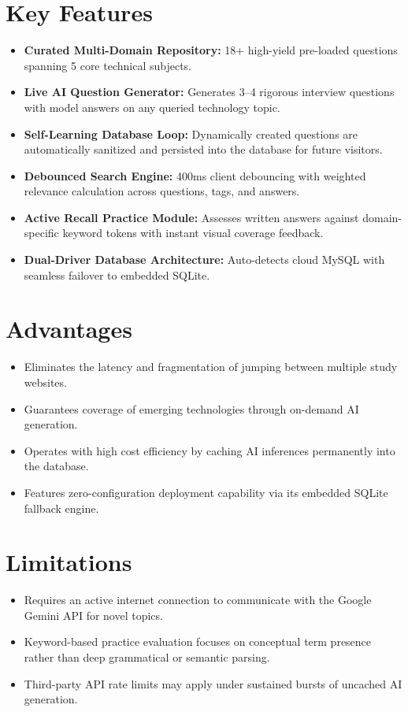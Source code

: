 \section{Key Features}
\begin{itemize}
    \item \textbf{Curated Multi-Domain Repository:} 18+ high-yield pre-loaded questions spanning 5 core technical subjects.
    \item \textbf{Live AI Question Generator:} Generates 3--4 rigorous interview questions with model answers on any queried technology topic.
    \item \textbf{Self-Learning Database Loop:} Dynamically created questions are automatically sanitized and persisted into the database for future visitors.
    \item \textbf{Debounced Search Engine:} 400ms client debouncing with weighted relevance calculation across questions, tags, and answers.
    \item \textbf{Active Recall Practice Module:} Assesses written answers against domain-specific keyword tokens with instant visual coverage feedback.
    \item \textbf{Dual-Driver Database Architecture:} Auto-detects cloud MySQL with seamless failover to embedded SQLite.
\end{itemize}

\section{Advantages}
\begin{itemize}
    \item Eliminates the latency and fragmentation of jumping between multiple study websites.
    \item Guarantees coverage of emerging technologies through on-demand AI generation.
    \item Operates with high cost efficiency by caching AI inferences permanently into the database.
    \item Features zero-configuration deployment capability via its embedded SQLite fallback engine.
\end{itemize}

\section{Limitations}
\begin{itemize}
    \item Requires an active internet connection to communicate with the Google Gemini API for novel topics.
    \item Keyword-based practice evaluation focuses on conceptual term presence rather than deep grammatical or semantic parsing.
    \item Third-party API rate limits may apply under sustained bursts of uncached AI generation.
\end{itemize}
